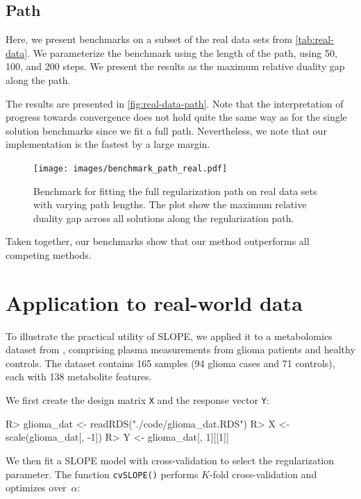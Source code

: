 \documentclass[article]{jss}
\begin{document}
\subsection{Path}\label{sec:path-benchmark}

Here, we present benchmarks
on a subset of the real data sets from \autoref{tab:real-data}. We parameterize
the benchmark using the length of the path, using 50, 100, and 200 steps. We
present the results as the maximum relative duality gap along the path.

The results are presented in \autoref{fig:real-data-path}. Note that the interpretation
of progress towards convergence does not hold quite the same way as for the single
solution benchmarks since we fit a full path. Nevertheless, we note that our
implementation is the fastest by a large margin.

\begin{figure}[tp]
  \centering
  \texttt{[image: images/benchmark\_path\_real.pdf]}
  \caption{%
    Benchmark for fitting the full regularization path on real data sets with
    varying path lengths. The plot show the maximum relative duality gap across all
    solutions along the regularization path.
  }
  \label{fig:real-data-path}
\end{figure}

Taken together, our benchmarks show that our method outperforms all competing
methods.

\section{Application to real-world data}\label{sec:realdat}

To illustrate the practical utility of SLOPE, we applied it to a metabolomics
dataset from \citet{Godlewski2023}, comprising plasma measurements from glioma
patients and healthy controls. The dataset contains 165 samples (94 glioma
cases and 71 controls), each with 138 metabolite features.

We first create the design matrix \texttt{X} and the response vector
\texttt{Y}:

\begin{Code}
R> glioma_dat <- readRDS("./code/glioma_dat.RDS")
R> X <- scale(glioma_dat[, -1])
R> Y <- glioma_dat[, 1][[1]]
\end{Code}

We then fit a SLOPE model with cross-validation to select the regularization
parameter. The function \texttt{cvSLOPE()} performs $K$-fold cross-validation
and optimizes over~$\alpha$:
\end{document}
